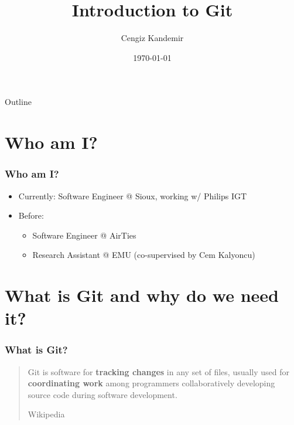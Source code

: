 \documentclass{beamer}
\title{Introduction to Git}
\author{Cengiz Kandemir}
\date{\today}
\begin{document}
\frame{\titlepage}

\begin{frame}{Outline}
  \tableofcontents
\end{frame}

\section{Who am I?}
\begin{frame}
  \frametitle{Who am I?}
  \begin{itemize}
  \item[] Currently: Software Engineer @ Sioux, working w/ Philips IGT
  \item[] Before:
    \begin{itemize}
    \item[] Software Engineer @ AirTies
    \item[] Research Assistant @ EMU (co-supervised by Cem Kalyoncu)
    \end{itemize}
  \end{itemize}
\end{frame}

\section{What is Git and why do we need it?}
\begin{frame}
  \frametitle{What is Git?}
  \begin{quote}
    Git is software for \textbf{tracking changes} in any set of files, usually used for \textbf{coordinating work} among programmers collaboratively developing source code during software development. \\ \begin{flushright}Wikipedia\end{flushright}
  \end{quote}
\end{frame}
\end{document}
